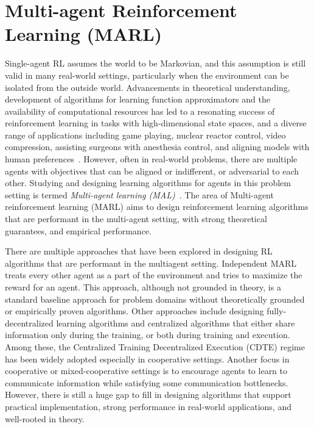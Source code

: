 \section{Multi-agent Reinforcement Learning (MARL)}\label{sec:marl}
Single-agent RL assumes the world to be Markovian, and this assumption is still valid in many
real-world settings, particularly when the environment can be isolated from the outside world.
Advancements in theoretical understanding, development of algorithms for learning function
approximators and the availability of computational resources has led to a resonating success of
reinforcement learning in tasks with high-dimensional state spaces, and a diverse range of
applications including game playing, nuclear reactor control, video compression, assisting surgeons
with anesthesia control, and aligning models with human preferences~.
However, often in real-world problems, there are multiple agents with objectives that can be
aligned or indifferent, or adversarial to each other.
Studying and designing learning algorithms for agents in this problem setting is termed
\textit{Multi-agent learning (MAL)}~\cite{tuylsMultiagent2012}.
The area of Multi-agent reinforcement learning (MARL) aims to design reinforcement learning
algorithms that are performant in the multi-agent setting, with strong theoretical guarantees, and
empirical performance.

There are multiple approaches that have been explored in designing RL algorithms that are
performant in the multiagent setting.
Independent MARL treats every other agent as a part of the environment and tries to maximize the
reward for an agent.
This approach, although not grounded in theory, is a standard baseline approach for problem domains
without theoretically grounded or empirically proven algorithms.
Other approaches include designing fully-decentralized learning algorithms and centralized
algorithms that either share information only during the training, or both during training and
execution.
Among these, the Centralized Training Decentralized Execution (CDTE) regime has been widely
adopted especially in cooperative settings.
Another focus in cooperative or mixed-cooperative settings is to encourage agents to learn to
communicate information while satisfying some communication bottlenecks.
However, there is still a huge gap to fill in designing algorithms that support practical
implementation, strong performance in real-world applications, and well-rooted in theory.

